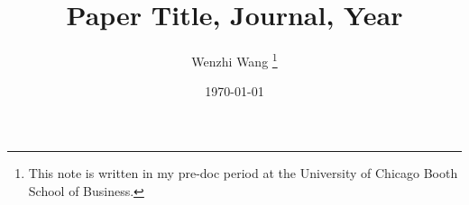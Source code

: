 \documentclass[12pt]{article}
\theoremstyle{definition}
\begin{document}

\title{\bf Paper Title, Journal, Year}
\author{Wenzhi Wang \thanks{This note is written in my pre-doc period at the University of Chicago Booth School of Business.} } 
\date{\today}
\maketitle


\begin{table}[H]
	\centering
	\caption{}
    \resizebox{0.7\textwidth}{!}{
        \begin{threeparttable}
            
        \end{threeparttable}
    }
\end{table}

\begin{table}[H]
	\centering
	\caption{}
    \resizebox{0.7\textwidth}{!}{
        \begin{threeparttable}
            
        \end{threeparttable}
    }
\end{table}

\newpage

\begin{table}[H]
	\centering
	\caption{}
    \resizebox{0.7\textwidth}{!}{
        \begin{threeparttable}
            
        \end{threeparttable}
    }
\end{table}
\end{document}
